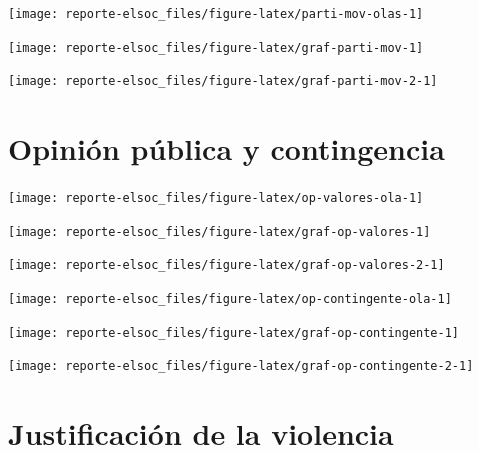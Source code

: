 \documentclass[
  12pt,
]{book}
\begin{document}
\begin{center}\texttt{[image: reporte-elsoc\_files/figure-latex/parti-mov-olas-1]} \end{center}

\begin{center}\texttt{[image: reporte-elsoc\_files/figure-latex/graf-parti-mov-1]} \end{center}

\begin{center}\texttt{[image: reporte-elsoc\_files/figure-latex/graf-parti-mov-2-1]} \end{center}

\hypertarget{opiniuxf3n-puxfablica-y-contingencia}{%
\section{Opinión pública y contingencia}\label{opiniuxf3n-puxfablica-y-contingencia}}

\begin{center}\texttt{[image: reporte-elsoc\_files/figure-latex/op-valores-ola-1]} \end{center}

\begin{center}\texttt{[image: reporte-elsoc\_files/figure-latex/graf-op-valores-1]} \end{center}

\begin{center}\texttt{[image: reporte-elsoc\_files/figure-latex/graf-op-valores-2-1]} \end{center}

\begin{center}\texttt{[image: reporte-elsoc\_files/figure-latex/op-contingente-ola-1]} \end{center}

\begin{center}\texttt{[image: reporte-elsoc\_files/figure-latex/graf-op-contingente-1]} \end{center}

\begin{center}\texttt{[image: reporte-elsoc\_files/figure-latex/graf-op-contingente-2-1]} \end{center}

\hypertarget{justificaciuxf3n-de-la-violencia}{%
\section{Justificación de la violencia}\label{justificaciuxf3n-de-la-violencia}}
\end{document}
